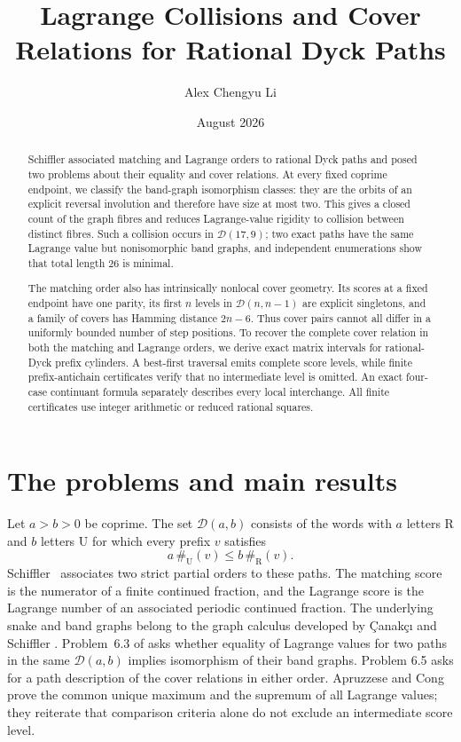 \documentclass[11pt]{amsart}
\title[Lagrange collisions and cover relations]
{Lagrange Collisions and Cover Relations for Rational Dyck Paths}
\author{Alex Chengyu Li}
\date{August 2026}
\theoremstyle{definition}
\newcommand{\RR}{\mathrm{R}}
\newcommand{\UU}{\mathrm{U}}
\newcommand{\cD}{\mathcal D}
\begin{document}
\begin{abstract}
Schiffler associated matching and Lagrange orders to rational Dyck paths and
posed two problems about their equality and cover relations.  At every fixed
coprime endpoint, we classify the band-graph isomorphism classes: they are the
orbits of an explicit reversal involution and therefore have size at most two.
This gives a closed count of the graph fibres and reduces Lagrange-value
rigidity to collision between distinct fibres.  Such a collision occurs in
$\cD(17,9)$; two exact paths have the same Lagrange value but nonisomorphic
band graphs, and independent enumerations show that total length $26$ is
minimal.

The matching order also has intrinsically nonlocal cover geometry.  Its scores
at a fixed endpoint have one parity, its first $n$ levels in $\cD(n,n-1)$ are
explicit singletons, and a family of covers has Hamming distance $2n-6$.
Thus cover pairs cannot all differ in a uniformly bounded number of step
positions.  To recover the complete cover relation in both the matching and
Lagrange orders, we derive exact matrix intervals for rational-Dyck prefix
cylinders.  A best-first traversal emits complete score levels, while finite
prefix-antichain certificates verify that no intermediate level is omitted.
An exact four-case continuant formula separately describes every local
interchange.  All finite certificates use integer arithmetic or reduced
rational squares.
\end{abstract}

\maketitle

\section{The problems and main results}

Let $a>b>0$ be coprime.  The set $\cD(a,b)$ consists of the words with $a$
letters $\RR$ and $b$ letters $\UU$ for which every prefix $v$ satisfies
\[
  a\,\#_{\UU}(v)\leq b\,\#_{\RR}(v).
\]
Schiffler~\cite{Schiffler} associates two strict partial orders to these
paths.  The matching score is the numerator of a finite continued fraction,
and the Lagrange score is the Lagrange number of an associated periodic
continued fraction.  The underlying snake and band graphs belong to the graph
calculus developed by \c{C}anak\c{c}\i{} and Schiffler
\cite{CanakciSchifflerBand}.  Problem~6.3 of \cite{Schiffler} asks whether
equality of Lagrange values for two paths in the same $\cD(a,b)$ implies
isomorphism of their band graphs.  Problem 6.5 asks for a path description of
the cover relations in either order.  Apruzzese and Cong
\cite{ApruzzeseCong} prove the common unique maximum and the supremum of all
Lagrange values; they reiterate that comparison criteria alone do not exclude
an intermediate score level.
\end{document}
